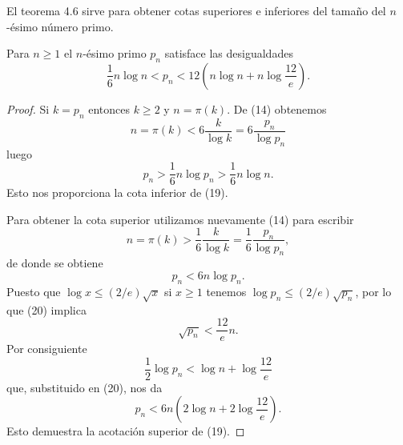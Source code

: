 \documentclass[12pt,a4paper]{book}
\begin{document}
    El teorema 4.6 sirve para obtener cotas superiores e inferiores del tamaño del
    $n$-ésimo número primo.

    \begin{teorema}
        Para $n\geq1$ el $n$-ésimo primo $p_{n}$ satisface las desigualdades
        \begin{equation}
            \frac{1}{6}n\log n<p_{n}<12\left(n\log n+n\log\frac{12}{e}\right).
        \end{equation}
    \end{teorema}

    \begin{proof}
        Si $k=p_{n}$ entonces $k\geq2$ y $n=\pi(k)$. De (14) obtenemos
        \begin{equation*}
            n=\pi(k)<6\frac{k}{\log k}=6\frac{p_{n}}{\log p_{n}}
        \end{equation*}
        luego
        \begin{equation*}
            p_{n}>\frac{1}{6}n\log p_{n}>\frac{1}{6}n\log n.
        \end{equation*}
        Esto nos proporciona la cota inferior de (19).

        Para obtener la cota superior utilizamos nuevamente (14) para escribir
        \begin{equation*}
            n=\pi(k)>\frac{1}{6}\frac{k}{\log k}=\frac{1}{6}\frac{p_{n}}{\log p_{n}},
        \end{equation*}
        de donde se obtiene
        \begin{equation}
            p_{n}<6n\log p_{n}.
        \end{equation}
        Puesto que $\log x\leq(2/e)\sqrt{x}$ si $x\geq1$ tenemos $\log p_{n}\leq(2/e)\sqrt{p_{n}}$,
        por lo que (20) implica
        \begin{equation*}
            \sqrt{p_{n}}<\frac{12}{e}n.
        \end{equation*}
        Por consiguiente
        \begin{equation*}
            \frac{1}{2}\log p_{n}<\log n+\log\frac{12}{e}
        \end{equation*}
        que, substituido en (20), nos da
        \begin{equation*}
            p_{n}<6n\left(2\log n+2\log\frac{12}{e}\right).
        \end{equation*}
        Esto demuestra la acotación superior de (19).
    \end{proof}
\end{document}
